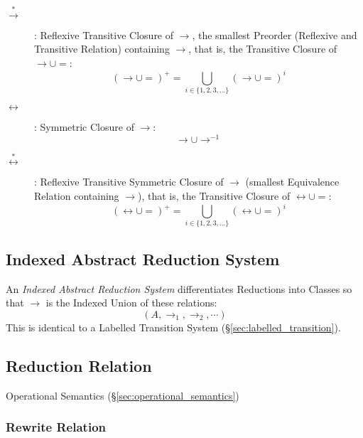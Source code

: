 \begin{description}

\item [$\stackrel{*}\rightarrow$]: Reflexive Transitive Closure of
  $\rightarrow$, the smallest Preorder (Reflexive and Transitive
  Relation) containing $\rightarrow$, that is, the Transitive Closure
  of $\rightarrow \cup =$:
  \[ (\rightarrow \cup =)^+ =
  \bigcup_{i \in \{1,2,3,...\}} (\rightarrow \cup =)^i \]

\item [$\leftrightarrow$]: Symmetric Closure of $\rightarrow$:
  \[ \rightarrow \cup \rightarrow^{-1} \]

\item [$\stackrel{*}\leftrightarrow$]: Reflexive Transitive
  Symmetric Closure of $\rightarrow$ (smallest Equivalence Relation
  containing $\rightarrow$), that is, the Transitive Closure of
  $\leftrightarrow \cup =$:
  \[ (\leftrightarrow \cup =)^+ =
  \bigcup_{i \in \{1,2,3,...\}} (\leftrightarrow \cup =)^i \]

\end{description}



\subsection{Indexed Abstract Reduction System}
\label{sec:indexed_rewrite}

An \emph{Indexed Abstract Reduction System} differentiates Reductions
into Classes so that $\rightarrow$ is the Indexed Union of these
relations:
\[
  (A, \rightarrow_1, \rightarrow_2, \cdots)
\]
This is identical to a Labelled Transition System
(\S\ref{sec:labelled_transition}).



\subsection{Reduction Relation}\label{sec:reduction_relation}

Operational Semantics (\S\ref{sec:operational_semantics})



\subsubsection{Rewrite Relation}\label{sec:rewrite_relation}

